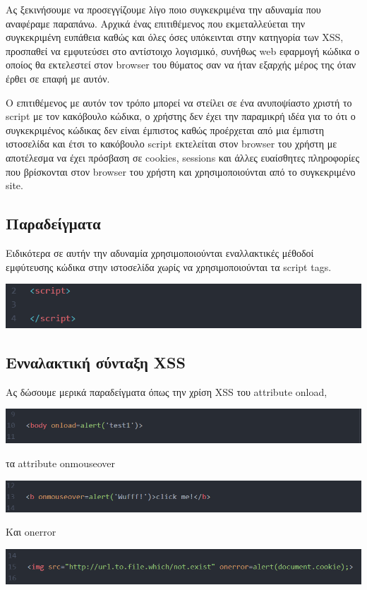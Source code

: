 \noindent
Ας ξεκινήσουμε να προσεγγίζουμε λίγο ποιο συγκεκριμένα την αδυναμία που αναφέραμε παραπάνω.  Αρχικά ένας επιτιθέμενος που εκμεταλλεύεται την συγκεκριμένη ευπάθεια καθώς και όλες όσες υπόκεινται στην κατηγορία των XSS, προσπαθεί να εμφυτεύσει στο αντίστοιχο λογισμικό, συνήθως web εφαρμογή κώδικα ο οποίος θα εκτελεστεί στον browser του θύματος σαν να ήταν εξαρχής μέρος της όταν έρθει σε επαφή με αυτόν. 

\noindent
Ο επιτιθέμενος με αυτόν τον τρόπο μπορεί να στείλει σε ένα ανυποψίαστο χριστή το script με τον κακόβουλο κώδικα, ο χρήστης δεν έχει την παραμικρή ιδέα για το ότι ο συγκεκριμένος κώδικας δεν είναι έμπιστος καθώς προέρχεται από μια έμπιστη ιστοσελίδα και έτσι το κακόβουλο script εκτελείται στον browser του χρήστη με αποτέλεσμα να έχει πρόσβαση σε cookies, sessions και άλλες ευαίσθητες πληροφορίες που βρίσκονται στον browser του χρήστη και χρησιμοποιούνται από το συγκεκριμένο site.

\subsection{Παραδείγματα}
\noindent
Ειδικότερα σε αυτήν την αδυναμία χρησιμοποιούνται εναλλακτικές μέθοδοί εμφύτευσης κώδικα στην ιστοσελίδα χωρίς να χρησιμοποιούνται τα script tags.
\begin{center}
			\includegraphics[width=1\textwidth]{image/1 script tags.PNG}		
\end{center}

\subsection{Ενναλακτική σύνταξη XSS}
\noindent
Ας δώσουμε μερικά παραδείγματα όπως την χρίση XSS του attribute onload,
\begin{center}
			\includegraphics[width=1\textwidth]{image/2.PNG}		
\end{center}

\noindent
τα attribute onmouseover
\begin{center}
			\includegraphics[width=1\textwidth]{image/3.PNG}		
\end{center}
\noindent
Και onerror
\begin{center}
			\includegraphics[width=1\textwidth]{image/4.PNG}		
\end{center}
